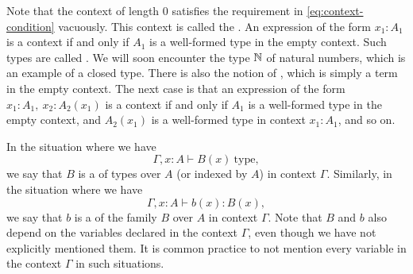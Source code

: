 Note that the context of length $0$ satisfies the requirement in \cref{eq:context-condition} vacuously. This context is called the . An expression of the form $x_1:A_1$ is a context if and only if $A_1$ is a well-formed type in the empty context. Such types are called . We will soon encounter the type $\mathbb{N}$ of natural numbers, which is an example of a closed type. There is also the notion of , which is simply a term in the empty context. The next case is that an expression of the form $x_1:A_1,~x_2:A_2(x_1)$ is a context if and only if $A_1$ is a well-formed type in the empty context, and $A_2(x_1)$ is a well-formed type in context $x_1:A_1$, and so on.

In the situation where we have
\begin{equation*}
  \Gamma,x:A\vdash B(x)~\mathrm{type},
\end{equation*}
we say that $B$ is a  of types over $A$ (or indexed by $A$) in context $\Gamma$. Similarly, in the situation where we have
\begin{equation*}
  \Gamma,x:A\vdash b(x):B(x),
\end{equation*}
we say that $b$ is a  of the family $B$ over $A$ in context $\Gamma$. Note that $B$ and $b$ also depend on the variables declared in the context $\Gamma$, even though we have not explicitly mentioned them. It is common practice to not mention every variable in the context $\Gamma$ in such situations.

